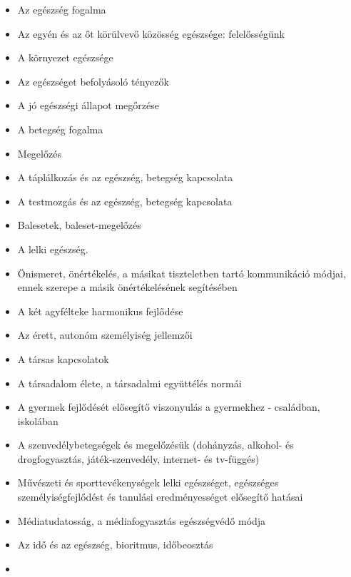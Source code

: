 \begin{itemize}

      \item
            Az egészség fogalma
      \item
            Az egyén és az őt körülvevő közösség egészsége: felelősségünk
      \item
            A környezet egészsége
      \item
            Az egészséget befolyásoló tényezők
      \item
            A jó egészségi állapot megőrzése
      \item
            A betegség fogalma
      \item
            Megelőzés
      \item
            A táplálkozás és az egészség, betegség kapcsolata
      \item
            A testmozgás és az egészség, betegség kapcsolata
      \item
            Balesetek, baleset-megelőzés
      \item
            A lelki egészség.
      \item
            Önismeret, önértékelés, a másikat tiszteletben tartó kommunikáció
            módjai, ennek szerepe a másik önértékelésének segítésében
      \item
            A két agyfélteke harmonikus fejlődése
      \item
            Az érett, autonóm személyiség jellemzői
      \item
            A társas kapcsolatok
      \item
            A társadalom élete, a társadalmi együttélés normái
      \item
            A gyermek fejlődését elősegítő viszonyulás a gyermekhez -
            családban,
            iskolában
      \item
            A szenvedélybetegségek és megelőzésük (dohányzás, alkohol- és
            drogfogyasztás, játék-szenvedély, internet- és tv-függés)
      \item
            Művészeti és sporttevékenységek lelki egészséget, egészséges
            személyiségfejlődést és tanulási eredményességet elősegítő hatásai
      \item
            Médiatudatosság, a médiafogyasztás egészségvédő módja
      \item
            Az idő és az egészség, bioritmus, időbeosztás
      \item

\end{itemize}
